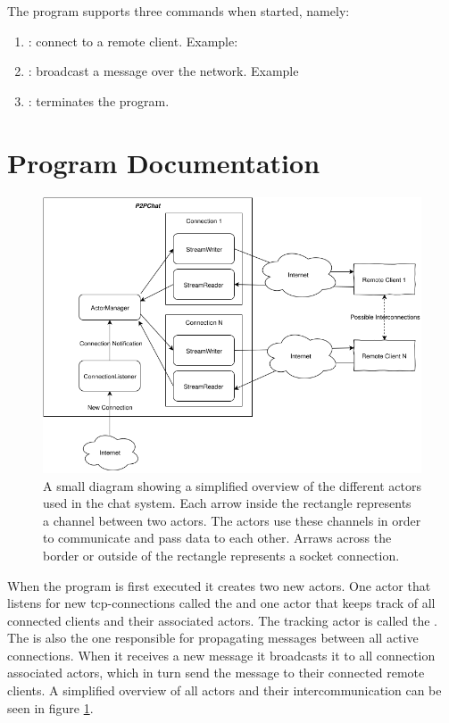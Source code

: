\noindent The program supports three commands when started, namely:
\begin{enumerate}
  \item {}: connect to a remote client. Example: 
  \item {}: broadcast a message over the network. Example 
  \item {}: terminates the program.
\end{enumerate}

\section{Program Documentation}\label{sec:documentation}
\begin{figure}[H]
  \centering
  \includegraphics[width=\textwidth]{figures/p2pchat_structure.png}
  \caption{A small diagram showing a simplified overview of the different actors used in the chat system. Each arrow inside the  rectangle represents a channel between two actors. The actors use these channels in order to communicate and pass data to each other. Arraws across the border or outside of the rectangle represents a socket connection.}
  \label{fig:simple_overview}
\end{figure}

When the program is first executed it creates two new actors. One actor that listens for new tcp-connections called the  and one actor that keeps track of all connected clients and their associated actors. The tracking actor is called the . The  is also the one responsible for propagating messages between all active connections. When it receives a new message it broadcasts it to all connection associated actors, which in turn send the message to their connected remote clients. A simplified overview of all actors and their intercommunication can be seen in figure \ref{fig:simple_overview}.

